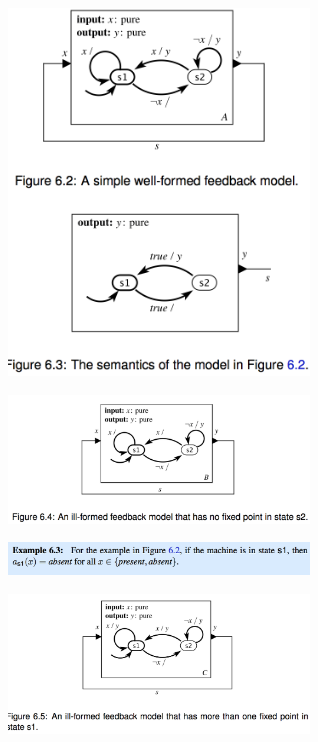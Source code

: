 \documentclass[10pt,landscape]{article}
\begin{document}
\begin{multicols}{3}
\begin{center}
\includegraphics*[width = 8cm]{Fig12.png}\\
\end{center}

\begin{center}
\includegraphics*[width = 8cm]{Fig13.png}\\
\end{center}

\begin{center}
\includegraphics*[width = 8cm]{Fig14.png}\\
\end{center}

\begin{center}
\includegraphics*[width = 8cm]{Fig15.png}\\
\end{center}


\end{multicols}
\end{document}
